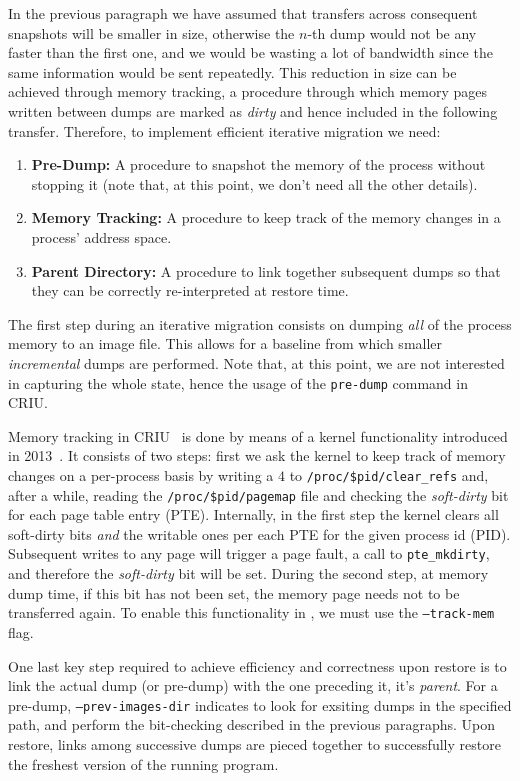 In the previous paragraph we have assumed that transfers across consequent snapshots will be smaller in size, otherwise the $n$-th dump would not be any faster than the first one, and we would be wasting a lot of bandwidth since the same information would be sent repeatedly.
This reduction in size can be achieved through memory tracking, a procedure through which memory pages written between dumps are marked as \emph{dirty} and hence included in the following transfer.
Therefore, to implement efficient iterative migration we need:
\begin{enumerate}
    \item \textbf{Pre-Dump:} A procedure to snapshot the memory of the process without stopping it (note that, at this point, we don't need all the other details).
    \item \textbf{Memory Tracking:} A procedure to keep track of the memory changes in a process' address space.
    \item \textbf{Parent Directory:} A procedure to link together subsequent dumps so that they can be correctly re-interpreted at restore time.
\end{enumerate}

The first step during an iterative migration consists on dumping \emph{all} of the process memory to an image file.
This allows for a baseline from which smaller \emph{incremental} dumps are performed.
Note that, at this point, we are not interested in capturing the whole state, hence the usage of the \texttt{pre-dump} command in CRIU.

Memory tracking in CRIU~\cite{criu-memory-tracking} is done by means of a kernel functionality introduced in 2013~\cite{criu-memory-tracking-lwn}.
It consists of two steps: first we ask the kernel to keep track of memory changes on a per-process basis by writing a $4$ to \texttt{/proc/\$pid/clear\_refs} and, after a while, reading the \texttt{/proc/\$pid/pagemap} file and checking the \textit{soft-dirty} bit for each page table entry (PTE).
Internally, in the first step the kernel clears all soft-dirty bits \emph{and} the writable ones per each PTE for the given process id (PID).
Subsequent writes to any page will trigger a page fault, a call to \texttt{pte\_mkdirty}, and therefore the \textit{soft-dirty} bit will be set.
During the second step, at memory dump time, if this bit has not been set, the memory page needs not to be transferred again.
To enable this functionality in \criu, we must use the \texttt{--track-mem} flag.

One last key step required to achieve efficiency and correctness upon restore is to link the actual dump (or pre-dump) with the one preceding it, it's \emph{parent}.
For a pre-dump, \texttt{--prev-images-dir} indicates \criu to look for exsiting dumps in the specified path, and perform the bit-checking described in the previous paragraphs.
Upon restore, links among successive dumps are pieced together to successfully restore the freshest version of the running program.

